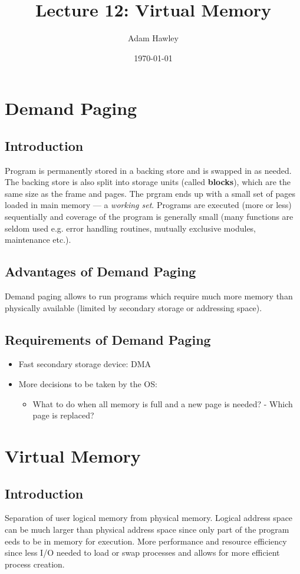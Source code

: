 \documentclass[11pt]{article}
\author{Adam Hawley}
\date{\today}
\title{Lecture 12: Virtual Memory}
\begin{document}
\maketitle
\tableofcontents


\section{Demand Paging}
\label{sec:orge98cd7e}
\subsection{Introduction}
\label{sec:orgd11b047}
Program is permanently stored in a backing store and is swapped in as needed.
The backing store is also split into storage units (called \textbf{blocks}), which are the same size as the frame and pages.
The prgram ends up with a small set of pages loaded in main memory --- a \emph{working set}.
Programs are executed (more or less) sequentially and coverage of the program is generally small (many functions are seldom used e.g. error handling routines, mutually exclusive modules, maintenance etc.).
\subsection{Advantages of Demand Paging}
\label{sec:orgf47bba3}
Demand paging allows to run programs which require much more memory than physically available (limited by secondary storage or addressing space).

\subsection{Requirements of Demand Paging}
\label{sec:orge156f17}
\begin{itemize}
\item Fast secondary storage device: DMA
\item More decisions to be taken by the OS:
\begin{itemize}
\item What to do when all memory is full and a new page is needed? - Which page is replaced?
\end{itemize}
\end{itemize}
\section{Virtual Memory}
\label{sec:orgf5b4dae}
\subsection{Introduction}
\label{sec:orgd127f1a}
Separation of user logical memory from physical memory.
Logical address space can be much larger than physical address space since only part of the program eeds to be in memory for execution.
More performance and resource efficiency since less I/O needed to load or swap processes and allows for more efficient process creation.
\end{document}
